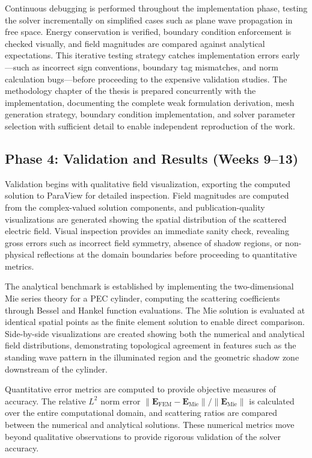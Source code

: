 \documentclass[class=report, crop=false]{standalone}
\begin{document}
Continuous debugging is performed throughout the implementation phase, testing the solver incrementally on simplified cases such as plane wave propagation in free space. Energy conservation is verified, boundary condition enforcement is checked visually, and field magnitudes are compared against analytical expectations. This iterative testing strategy catches implementation errors early—such as incorrect sign conventions, boundary tag mismatches, and norm calculation bugs—before proceeding to the expensive validation studies. The methodology chapter of the thesis is prepared concurrently with the implementation, documenting the complete weak formulation derivation, mesh generation strategy, boundary condition implementation, and solver parameter selection with sufficient detail to enable independent reproduction of the work.

\subsection{Phase 4: Validation and Results (Weeks 9--13)}

Validation begins with qualitative field visualization, exporting the computed solution to ParaView for detailed inspection. Field magnitudes are computed from the complex-valued solution components, and publication-quality visualizations are generated showing the spatial distribution of the scattered electric field. Visual inspection provides an immediate sanity check, revealing gross errors such as incorrect field symmetry, absence of shadow regions, or non-physical reflections at the domain boundaries before proceeding to quantitative metrics.

The analytical benchmark is established by implementing the two-dimensional Mie series theory for a PEC cylinder, computing the scattering coefficients through Bessel and Hankel function evaluations. The Mie solution is evaluated at identical spatial points as the finite element solution to enable direct comparison. Side-by-side visualizations are created showing both the numerical and analytical field distributions, demonstrating topological agreement in features such as the standing wave pattern in the illuminated region and the geometric shadow zone downstream of the cylinder.

Quantitative error metrics are computed to provide objective measures of accuracy. The relative $L^2$ norm error $\|\bm{E}_{\text{FEM}} - \bm{E}_{\text{Mie}}\|/\|\bm{E}_{\text{Mie}}\|$ is calculated over the entire computational domain, and scattering ratios are compared between the numerical and analytical solutions. These numerical metrics move beyond qualitative observations to provide rigorous validation of the solver accuracy.
\end{document}
